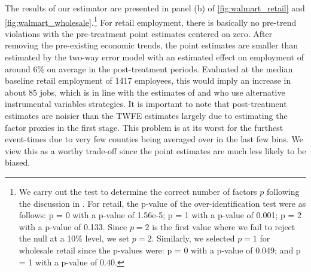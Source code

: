 \documentclass[12pt]{article}
\begin{document}
\begin{figure}
\end{figure}

The results of our estimator are presented in panel (b) of \autoref{fig:walmart_retail} and \autoref{fig:walmart_wholesale}.\footnote{We carry out the test to determine the correct number of factors $p$ following the discussion in \citet{Ahn_Lee_Schmidt_2013}. For retail, the p-value of the over-identification test were as follows: p = 0 with a p-value of 1.56e-5; p = 1 with a p-value of 0.001; p = 2 with a p-value of 0.133.  Since $p = 2$ is the first value where we fail to reject the null at a 10\% level, we set $p = 2$. Similarly, we selected $p = 1$ for wholesale retail since the p-values were: p = 0 with a p-value of 0.049; and p = 1 with a p-value of 0.40.} For retail employment, there is basically no pre-trend violations with the pre-treatment point estimates centered on zero. After removing the pre-existing economic trends, the point estimates are smaller than estimated by the two-way error model with an estimated effect on employment of around 6\% on average in the post-treatment periods. Evaluated at the median baseline retail employment of 1417 employees, this would imply an increase in about 85 jobs, which is in line with the estimates of \citet{basker2005job} and \citet{stapp2014Walmart} who use alternative instrumental variables strategies. It is important to note that post-treatment estimates are noisier than the TWFE estimates largely due to estimating the factor proxies in the first stage. This problem is at its worst for the furthest event-times due to very few counties being averaged over in the last few bins. We view this as a worthy trade-off since the point estimates are much less likely to be biased. 
\end{document}
